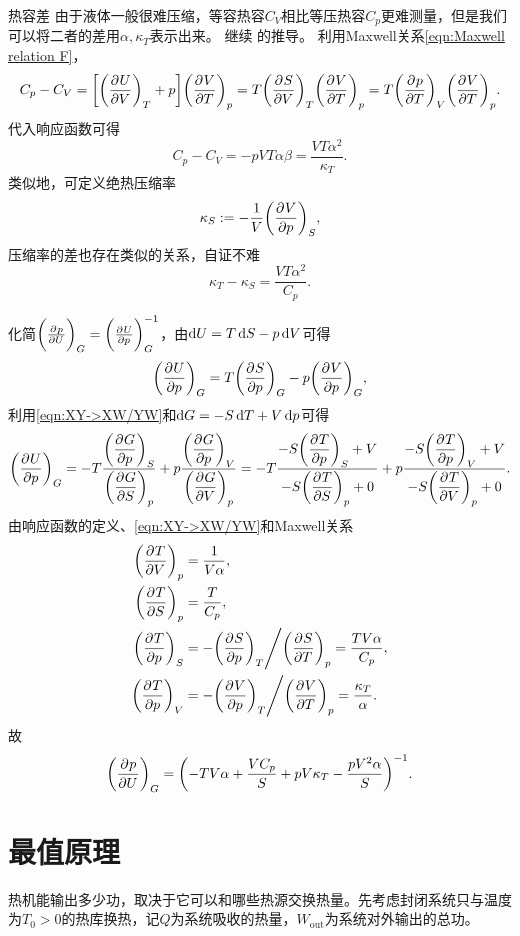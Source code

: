\begin{example}
	{热容差}{}
	由于液体一般很难压缩，等容热容$C_V$相比等压热容$C_p$更难测量，但是我们可以将二者的差用$\alpha,\kappa_T$表示出来。
	继续 的推导。
	利用Maxwell关系\eqref{eqn:Maxwell relation F}，
	\[
		C_p - C_V = \biggb{\pvat{U}{V}{T} + p}\pvat{V}{T}{p} = T\pvat{S}{V}{T}\pvat{V}{T}{p} = T\pvat{p}{T}{V}\pvat{V}{T}{p}.
	\]
	代入响应函数可得
	\begin{equation}
		C_p - C_V = -pVT\alpha\beta = \frac{VT\alpha^2}{\kappa_T}.
	\end{equation}
	\tcblower
	类似地，可定义绝热压缩率
	\begin{equation}
		\kappa_S := -\frac1V\pvat{V}{p}{S},
	\end{equation}
	压缩率的差也存在类似的关系，自证不难
	\begin{equation}
		\kappa_T - \kappa_S = \frac{VT\alpha^2}{C_p}.
	\end{equation}
\end{example}

\begin{example}{}{}
	化简$\pvat{p}{U}{G} = \pvat{U}{p}{G}^{-1}$，由$\d U = T\d S - p\d V$可得
	\[
		\pvat{U}{p}{G} = T\pvat{S}{p}{G} - p\pvat{V}{p}{G},
	\]
	利用\eqref{eqn:XY->XW/YW}和$\d G = -S\d T + V\d p$可得
	\[
		\pvat{U}{p}{G} = -T\fracdisp{\pvat{G}{p}{S}}{\pvat{G}{S}{p}} + p\fracdisp{\pvat{G}{p}{V}}{\pvat{G}{V}{p}} = -T\fracdisp{-S\pvat{T}{p}{S} + V}{-S\pvat{T}{S}{p} + 0} + p\fracdisp{-S\pvat{T}{p}{V} + V}{-S\pvat{T}{V}{p} + 0}.
	\]
	由响应函数的定义、\eqref{eqn:XY->XW/YW}和Maxwell关系
	\begin{align*}
		\pvat{T}{V}{p} &= \frac1{V\alpha},\\
		\pvat{T}{S}{p} &= \frac{T}{C_p},\\
		\pvat{T}{p}{S} &= -\Biggdivision{\pvat{S}{p}{T}}{\pvat{S}{T}{p}} = \frac{TV\alpha}{C_p},\\
		\pvat{T}{p}{V} &= -\Biggdivision{\pvat{V}{p}{T}}{\pvat{V}{T}{p}} = \frac{\kappa_T}\alpha.
	\end{align*}
	故
	\[
		\pvat{p}{U}{G} = \biggp{-TV\alpha + \frac{VC_p}S + pV\kappa_T - \frac{pV^2\alpha}S}^{-1}.
	\]
\end{example}

\section{最值原理}

热机能输出多少功，取决于它可以和哪些热源交换热量。先考虑封闭系统只与温度为$T_0 > 0$的热库换热，记$Q$为系统吸收的热量，$W_{\mathrm{out}}$为系统对外输出的总功。

